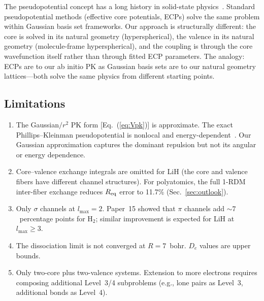 \documentclass[aps,pra,twocolumn,superscriptaddress,longbibliography,floatfix]{revtex4-2}
\begin{document}
The pseudopotential concept has a long history in solid-state
physics~\cite{heine1970,bachelet1982}.
Standard pseudopotential methods (effective core potentials, ECPs) solve
the same problem within Gaussian basis set frameworks.  Our approach is
structurally different: the core is solved in its natural geometry
(hyperspherical), the valence in its natural geometry (molecule-frame
hyperspherical), and the coupling is through the core wavefunction
itself rather than through fitted ECP parameters.  The analogy:
ECPs are to our ab initio PK as Gaussian basis sets are to our
natural geometry lattices---both solve the same physics from
different starting points.


\subsection{Limitations}
\label{sec:limitations}

\begin{enumerate}
\item The Gaussian$/r^2$ PK form [Eq.~(\ref{eq:Vpk})] is approximate.
  The exact Phillips--Kleinman pseudopotential is nonlocal and
  energy-dependent~\cite{pk1959}.  Our Gaussian approximation captures
  the dominant repulsion but not its angular or energy dependence.

\item Core--valence exchange integrals are omitted for LiH (the core
  and valence fibers have different channel structures).  For
  polyatomics, the full 1-RDM inter-fiber exchange reduces
  $R_{\rm eq}$ error to 11.7\% (Sec.~\ref{sec:outlook}).

\item Only $\sigma$ channels at $l_{\max} = 2$.  Paper~15 showed that
  $\pi$ channels add ${\sim}7$~percentage points for H$_2$; similar
  improvement is expected for LiH at $l_{\max} \geq 3$.

\item The dissociation limit is not converged at $R = 7$~bohr.
  $D_e$ values are upper bounds.

\item Only two-core plus two-valence systems.  Extension to more
  electrons requires composing additional Level~3/4 subproblems (e.g.,
  lone pairs as Level~3, additional bonds as Level~4).
\end{enumerate}
\end{document}
